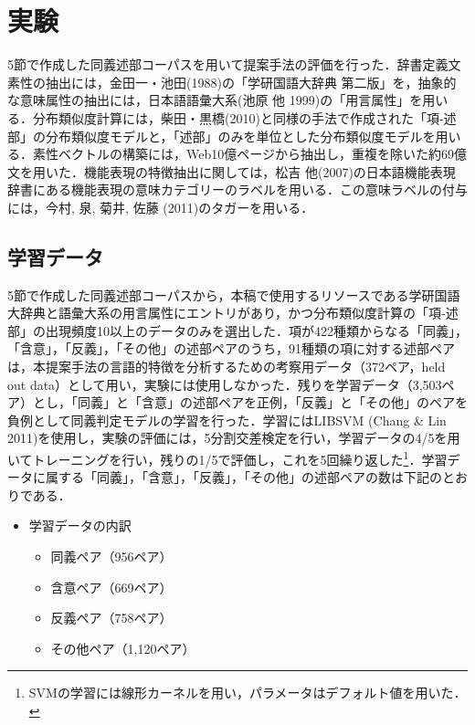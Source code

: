 \documentclass[japanese]{jnlp_1.4}
\begin{document}
\section{実験}

5節で作成した同義述部コーパスを用いて提案手法の評価を行った．辞書定義文素性の抽出には，金田一・池田(1988)の「学研国語大辞典 
第二版」を，抽象的な意味属性の抽出には，日本語語彙大系(池原 他 1999)の「用言属性」を用いる．分布類似度計算には，柴田・黒橋(2010)と同様の手法で作成された「項‐述部」の分布類似度モデルと，「述部」のみを単位とした分布類似度モデルを用いる．素性ベクトルの構築には，Web10億ページから抽出し，重複を除いた約69億文を用いた．機能表現の特徴抽出に関しては，松吉 他(2007)の日本語機能表現辞書にある機能表現の意味カテゴリーのラベルを用いる．この意味ラベルの付与には，今村, 泉, 菊井, 佐藤 (2011)のタガーを用いる．


\subsection{学習データ}

5節で作成した同義述部コーパスから，本稿で使用するリソースである学研国語大辞典と語彙大系の用言属性にエントリがあり，かつ分布類似度計算の「項‐述部」の出現頻度10以上のデータのみを選出した．項が422種類からなる「同義」，「含意」，「反義」，「その他」の述部ペアのうち，91種類の項に対する述部ペアは，本提案手法の言語的特徴を分析するための考察用データ（372ペア，held out data）として用い，実験には使用しなかった．残りを学習データ（3,503ペア）とし，「同義」と「含意」の述部ペアを正例，「反義」と「その他」のペアを負例として同義判定モデルの学習を行った．学習にはLIBSVM (Chang {\&} Lin 2011)を使用し，実験の評価には，5分割交差検定を行い，学習データの4/5を用いてトレーニングを行い，残りの1/5で評価し，これを5回繰り返した\footnote{SVMの学習には線形カーネルを用い，パラメータはデフォルト値を用いた．}．学習データに属する「同義」，「含意」，「反義」，「その他」の述部ペアの数は下記のとおりである．

\begin{itemize}
\item 学習データの内訳
	\begin{itemize}
	\item 同義ペア（956ペア）
	\item 含意ペア（669ペア）
	\item 反義ペア（758ペア）
	\item その他ペア（1,120ペア）
	\end{itemize}
\end{itemize}
\end{document}
